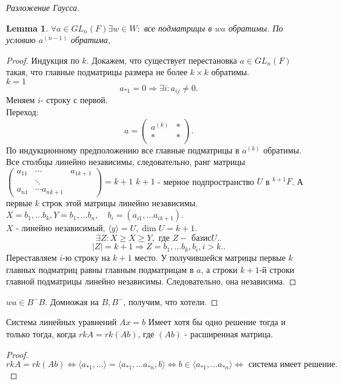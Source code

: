 \documentclass[11pt]{book}
\theoremstyle{definition}
\theoremstyle{plain}
\theoremstyle{plain}
\newtheorem*{lm}{Lemma}
\theoremstyle{definition}
\theoremstyle{remark}
\begin{document}
\begin{proof}[Разложение Гаусса]
    \begin{lm}
	$\forall a \in  GL_n(F) \exists w \in  W : $ все подматрицы в $wa$ обратимы.
	По условию $a^{(n-1)}$ обратима, 
    \end{lm}
    \begin{proof}
	Индукция по $k$.
	Докажем, что существует перестановка $a \in  GL_n(F)$ такая, что главные подматрицы размера не более $k \times k$ обратимы.
	\\
	$k=1$ \[
	    a_{*1} = 0 \Rightarrow \exists i: a_{ij} \ne 0
	.\] Меняем $i$- строку с первой.
	\\
	Переход:
	\[
	a = 
	\left ( 
	\begin{array}{cc}
	    a^{(k)}& *\\
	    * & *
	\end{array}
	\right )
	.\] 
	По индукционному предположению все главные подматрицы в $a^{(k)}$ обратимы.
	Все столбцы линейно независимы, следовательно, ранг матрицы $
	\left ( 
	\begin{array}{ccc}
	    a_{11} &\cdots&a_{1 k+1} \\
		   &\ddots&\\
	    a_{n 1}& \cdots a_{n k+1}
	\end{array}
	\right ) = k+1$
	$k+1$ - мерное подпространство $U$  в $^{k+1} F$. А первые $k$ строк этой матрицы линейно независимы. 
	$X = {b_1, \ldots b_k}, Y={b_1, \ldots b_n}, \quad b_i = (a_{i 1} , \ldots a_{i k+1})$. \\
	$X$ - линейно независимый, $\langle y \rangle = U, \dim U = k+1$.\\
	\[
	\exists Z : X \ge X \ge Y, \mbox{ где }Z - \mbox{ базис} U.
	.\] 
	\[
	    |Z| = k+1 \Rightarrow Z = {b_1, \ldots b_k, b_i}, i>k.
	.\] 
	Переставляем $ i$-ю строку на $k+1$ место. У получившейся матрицы первые $k$ главных подматриц равны главным подматрицам в $a$, а строки $k+1$-й строки главной подматрицы линейно независимы. Следовательно, она независима.
    \end{proof}
    $wa \in  B^- B$. Домножая на $B, B^-$, получим, что хотели.
\end{proof}
\begin{thm}
    Система линейных уравнений $Ax = b$ Имеет хотя бы одно решение тогда и только тогда, когда $rk A = rk (A b)$, где $(A b)$ - расширенная матрица.
\end{thm}
\begin{proof}
    \[
	rk A = rk(A b) \Leftrightarrow \langle a_{*1}, \ldots \rangle = \langle a_{*1} , \ldots a_{*n}, b \rangle \Leftrightarrow b \in  \langle a_{*1}, \ldots a_{*n} \rangle \Leftrightarrow \mbox{ система имеет решение}
    .\] 
\end{proof}
\end{document}
